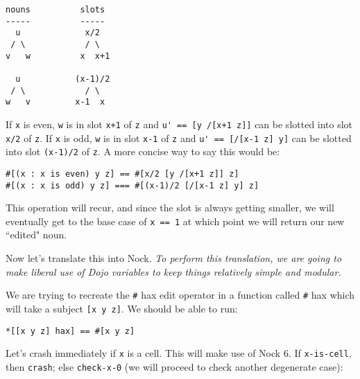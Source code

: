 \documentclass[twoside]{article}
\begin{document}
\begin{lstlisting}[style=listingblock]
nouns          slots
-----          -----
  u             x/2
 / \            / \ 
v   w          x  x+1

  u           (x-1)/2
 / \            / \
w   v         x-1  x
\end{lstlisting}

If \lstinline[style=inlinecode]{x} is even, \lstinline[style=inlinecode]{w} is in slot \lstinline[style=inlinecode]{x+1} of \lstinline[style=inlinecode]{z} and \lstinline[style=inlinecode]{u' == [y /[x+1 z]]} can be slotted into slot \lstinline[style=inlinecode]{x/2} of \lstinline[style=inlinecode]{z}. If \lstinline[style=inlinecode]{x} is odd, \lstinline[style=inlinecode]{w} is in slot \lstinline[style=inlinecode]{x-1} of \lstinline[style=inlinecode]{z} and \lstinline[style=inlinecode]{u' == [/[x-1 z] y]} can be slotted into slot \lstinline[style=inlinecode]{(x-1)/2} of \lstinline[style=inlinecode]{z}. A more concise way to say this would be:

\begin{lstlisting}[style=listingblock]
#[(x : x is even) y z] == #[x/2 [y /[x+1 z]] z]
#[(x : x is odd) y z] === #[(x-1)/2 [/[x-1 z] y] z]
\end{lstlisting}

This operation will recur, and since the slot is always getting smaller, we will eventually get to the base case of \lstinline[style=inlinecode]{x == 1} at which point we will return our new ``edited" noun.

Now let's translate this into Nock.  \emph{To perform this translation, we are going to make liberal use of Dojo variables to keep things relatively simple and modular.}

We are trying to recreate the \lstinline[style=inlinecode]{#} hax edit operator in a function called \lstinline[style=inlinecode]{#} hax which will take a subject \lstinline[style=inlinecode]{[x y z]}.  We should be able to run:

\begin{lstlisting}[style=listingblock]
*[[x y z] hax] == #[x y z]
\end{lstlisting}

Let's crash immediately if \lstinline[style=inlinecode]{x} is a cell. This will make use of Nock 6. If \lstinline[style=inlinecode]{x-is-cell}, then \lstinline[style=inlinecode]{crash}; else \lstinline[style=inlinecode]{check-x-0} (we will proceed to check another degenerate case):
\end{document}
